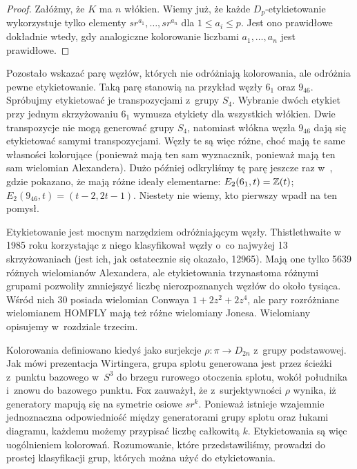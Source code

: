 \begin{proof}
    Załóżmy, że $K$ ma $n$ włókien.
    Wiemy już, że każde $D_p$-etykietowanie wykorzystuje tylko elementy $sr^{a_1}, \ldots, sr^{a_n}$ dla $1 \le a_i \le p$.
    Jest ono prawidłowe dokładnie wtedy, gdy analogiczne kolorowanie liczbami $a_1, \ldots, a_n$ jest prawidłowe.
\end{proof}

Pozostało wskazać parę węzłów, których nie odróżniają kolorowania, ale odróżnia pewne etykietowanie.
Taką parę stanowią na przykład węzły $6_1$ oraz $9_{46}$.
Spróbujmy etykietować je transpozycjami z~grupy $S_4$.
Wybranie dwóch etykiet przy jednym skrzyżowaniu $6_1$ wymusza etykiety dla wszystkich włókien.
Dwie transpozycje nie mogą generować grupy $S_4$, natomiast włókna węzła $9_{46}$ dają się etykietować samymi transpozycjami.
Węzły te są więc różne, choć mają te same własności kolorujące (ponieważ mają ten sam wyznacznik, ponieważ mają ten sam wielomian Alexandera).
Dużo później odkryliśmy tę parę jeszcze raz w~\cite[s. 138]{burde2014}, gdzie pokazano, że mają różne ideały elementarne: $E_2(6_1, t) = \mathbb Z(t)$; $E_2(9_{46}, t) = (t-2, 2t-1)$.
Niestety nie wiemy, kto pierwszy wpadł na ten pomysł.
%

Etykietowanie jest mocnym narzędziem odróżniającym węzły.
Thistlethwaite w 1985 roku korzystając z niego klasyfikował węzły o~co najwyżej 13 skrzyżowaniach (jest ich, jak ostatecznie się okazało, 12965).
Mają one tylko 5639 różnych wielomianów Alexandera, ale etykietowania trzynastoma różnymi grupami pozwoliły zmniejszyć liczbę nierozpoznanych węzłów do około tysiąca.
Wśród nich 30 posiada wielomian Conwaya $1 + 2z^2 + 2z^4$, ale pary rozróżniane wielomianem HOMFLY mają też różne wielomiany Jonesa.
Wielomiany opisujemy w~rozdziale trzecim.

Kolorowania definiowano kiedyś jako surjekcje $\rho \colon \pi \to D_{2n}$ z~grupy podstawowej.
Jak mówi prezentacja Wirtingera, grupa splotu generowana jest przez ścieżki z~punktu bazowego w~$S^3$ do brzegu rurowego otoczenia splotu, wokół południka i~znowu do bazowego punktu.
%
Fox zauważył, że z~surjektywności $\rho$ wynika, iż generatory mapują się na symetrie osiowe $sr^k$.
Ponieważ istnieje wzajemnie jednoznaczna odpowiedniość między generatorami grupy splotu oraz łukami diagramu, każdemu możemy przypisać liczbę całkowitą $k$.
Etykietowania są więc uogólnieniem kolorowań.
Rozumowanie, które przedstawiliśmy, prowadzi do prostej klasyfikacji grup, których można użyć do etykietowania.


